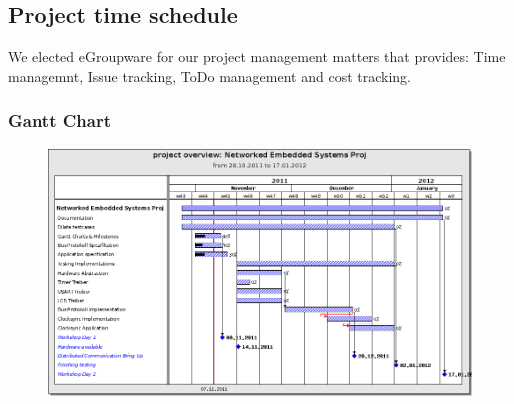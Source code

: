 \subsection{Project time schedule}

We elected eGroupware for our project management matters that provides:
Time managemnt, Issue tracking, ToDo management and cost tracking.

\subsubsection{Gantt Chart}
\begin{figure}[htbp]
  \vspace{-20pt}
  \begin{center}
    \includegraphics[angle=90,scale=0.50]{./images/201111_ganttchart}
  \end{center}
  \vspace{-20pt}
\end{figure}
\newpage

